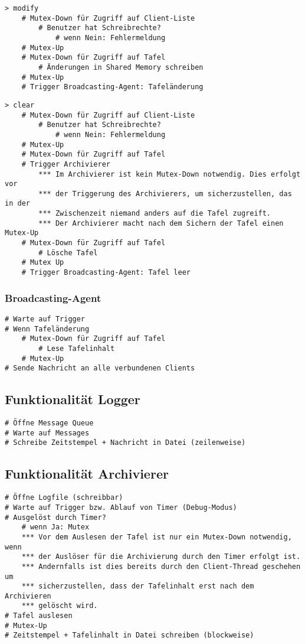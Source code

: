 \begin{lstlisting}
> modify
    # Mutex-Down für Zugriff auf Client-Liste
        # Benutzer hat Schreibrechte?
            # wenn Nein: Fehlermeldung
    # Mutex-Up
    # Mutex-Down für Zugriff auf Tafel
        # Änderungen in Shared Memory schreiben
    # Mutex-Up
    # Trigger Broadcasting-Agent: Tafeländerung
\end{lstlisting}
\begin{lstlisting}
> clear
    # Mutex-Down für Zugriff auf Client-Liste
        # Benutzer hat Schreibrechte?
            # wenn Nein: Fehlermeldung
    # Mutex-Up
    # Mutex-Down für Zugriff auf Tafel
    # Trigger Archivierer
        *** Im Archivierer ist kein Mutex-Down notwendig. Dies erfolgt vor
        *** der Triggerung des Archivierers, um sicherzustellen, das in der
        *** Zwischenzeit niemand anders auf die Tafel zugreift.
        *** Der Archivierer macht nach dem Sichern der Tafel einen Mutex-Up
    # Mutex-Down für Zugriff auf Tafel
        # Lösche Tafel  
    # Mutex Up
    # Trigger Broadcasting-Agent: Tafel leer
\end{lstlisting}

\subsubsection{Broadcasting-Agent}
\begin{lstlisting}
# Warte auf Trigger
# Wenn Tafeländerung
    # Mutex-Down für Zugriff auf Tafel
        # Lese Tafelinhalt
    # Mutex-Up
# Sende Nachricht an alle verbundenen Clients
\end{lstlisting}


\subsection{Funktionalität Logger}
\begin{lstlisting}
# Öffne Message Queue
# Warte auf Messages
# Schreibe Zeitstempel + Nachricht in Datei (zeilenweise)
\end{lstlisting}


\subsection{Funktionalität Archivierer}
\begin{lstlisting}
# Öffne Logfile (schreibbar)
# Warte auf Trigger bzw. Ablauf von Timer (Debug-Modus)
# Ausgelöst durch Timer?
    # wenn Ja: Mutex
    *** Vor dem Auslesen der Tafel ist nur ein Mutex-Down notwendig, wenn
    *** der Auslöser für die Archivierung durch den Timer erfolgt ist.
    *** Andernfalls ist dies bereits durch den Client-Thread geschehen um
    *** sicherzustellen, dass der Tafelinhalt erst nach dem Archivieren
    *** gelöscht wird.
# Tafel auslesen
# Mutex-Up
# Zeitstempel + Tafelinhalt in Datei schreiben (blockweise)
\end{lstlisting}


